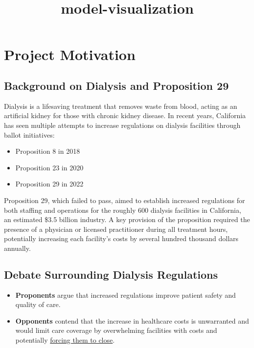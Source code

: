 \documentclass[
  11pt,
  letterpaper,
  DIV=11,
  numbers=noendperiod]{scrartcl}
\title{model-visualization}
\author{}
\date{}
\providecommand{\tightlist}{%
  \setlength{\itemsep}{0pt}\setlength{\parskip}{0pt}}\usepackage{longtable,booktabs,array}
\begin{document}
\maketitle

\section{Project Motivation}\label{project-motivation}

\subsection{Background on Dialysis and Proposition
29}\label{background-on-dialysis-and-proposition-29}

Dialysis is a lifesaving treatment that removes waste from blood, acting
as an artificial kidney for those with chronic kidney disease. In recent
years, California has seen multiple attempts to increase regulations on
dialysis facilities through ballot initiatives:

\begin{itemize}
\tightlist
\item
  Proposition 8 in 2018
\item
  Proposition 23 in 2020
\item
  Proposition 29 in 2022
\end{itemize}

Proposition 29, which failed to pass, aimed to establish increased
regulations for both staffing and operations for the roughly 600
dialysis facilities in California, an estimated \$3.5 billion industry.
A key provision of the proposition required the presence of a physician
or licensed practitioner during all treatment hours, potentially
increasing each facility's costs by several hundred thousand dollars
annually.

\subsection{Debate Surrounding Dialysis
Regulations}\label{debate-surrounding-dialysis-regulations}

\begin{itemize}
\tightlist
\item
  \textbf{Proponents} argue that increased regulations improve patient
  safety and quality of care.
\item
  \textbf{Opponents} contend that the increase in healthcare costs is
  unwarranted and would limit care coverage by overwhelming facilities
  with costs and potentially
  \href{https://www.latimes.com/california/story/2022-11-08/2022-california-election-prop-29-vote-dialysis-clinic-results}{forcing
  them to close}.
\end{itemize}
\end{document}
